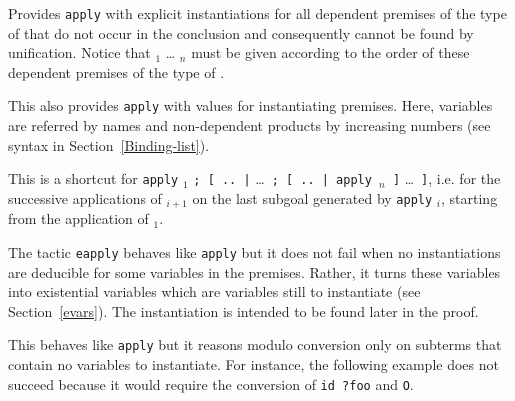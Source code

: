 \begin{Variants}

\item{}

  Provides {\tt apply} with explicit instantiations for all dependent
  premises of the type of {\term} that do not occur in the conclusion
  and consequently cannot be found by unification. Notice that
  {\term$_1$} \mbox{\dots} {\term$_n$} must be given according to the order
  of these dependent premises of the type of {\term}.

  \ErrMsg {}

\item{}

  This also provides {\tt apply} with values for instantiating
  premises. Here, variables are referred by names and non-dependent
  products by increasing numbers (see syntax in Section~\ref{Binding-list}).

\item {}

  This is a shortcut for {\tt apply} {\term$_1$} {\tt ; [ ..~|}
   \ldots~{\tt ; [ ..~| {\tt apply} {\term$_n$} ]} \ldots~{\tt ]}, i.e. for the
   successive applications of {\term$_{i+1}$} on the last subgoal
   generated by {\tt apply} {\term$_i$}, starting from the application
   of {\term$_1$}.

\item {}

  The tactic {\tt eapply} behaves like {\tt apply} but it does not fail
  when no instantiations are deducible for some variables in the
  premises. Rather, it turns these variables into 
  existential variables which are variables still to instantiate (see
  Section~\ref{evars}). The instantiation is intended to be found
  later in the proof.

\item {} 

  This behaves like {\tt apply} but it reasons modulo conversion only
  on subterms that contain no variables to instantiate. For instance,
  the following example does not succeed because it would require the
  conversion of {\tt id ?foo} and {\tt O}.


\end{Variants}
